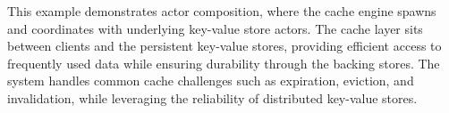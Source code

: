 \begin{example}
    This example demonstrates actor composition, where the cache engine spawns
    and coordinates with underlying key-value store actors. The cache layer sits
    between clients and the persistent key-value stores, providing efficient
    access to frequently used data while ensuring durability through the backing
    stores. The system handles common cache challenges such as expiration,
    eviction, and invalidation, while leveraging the reliability of distributed
    key-value stores.
    \end{example} 